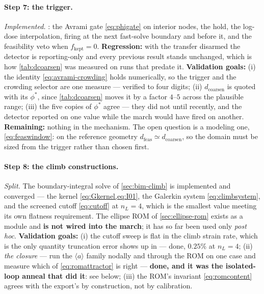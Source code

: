 \documentclass{article}
\newcommand{\aloop}{\ensuremath{\langle a\rangle}}
\begin{document}
\paragraph{Step 7: the trigger.} \emph{Implemented.} : the
Avrami gate \cref{eq:phigate} on interior nodes, the hold, the log-dose
interpolation, firing at the next fast-solve boundary and before it, and the
feasibility veto when $f_{\mathrm{kept}}=0$. \textbf{Regression:} with the
transfer disarmed the detector is reporting-only and every previous result stands
unchanged, which is how \cref{tab:dcoarsen} was measured on runs that predate it.
\textbf{Validation goals:} (i) the identity \cref{eq:avrami-crowding} holds
numerically, so the trigger and the crowding selector are one measure --- verified
to four digits; (ii) $d_{\mathrm{coarsen}}$ is quoted with its $\phi^\ast$, since
\cref{tab:dcoarsen} moves it by a factor $4$--$5$ across the plausible range;
(iii) the five copies of $\phi^\ast$ agree --- they did not until recently, and
the detector reported on one value while the march would have fired on another.
\textbf{Remaining:} nothing in the mechanism. The open question is a modeling
one, \cref{eq:feaswindow}: on the reference geometry $d_{\mathrm{feas}}\simeq
d_{\mathrm{coarsen}}$, so the domain must be sized from the trigger rather than
chosen first.

\paragraph{Step 8: the climb constructions.} \emph{Split.} The boundary-integral
solve of \cref{sec:bim-climb} is implemented and converged --- the kernel
\cref{eq:Gkernel,eq:I01}, the Galerkin system \cref{eq:climbsystem}, and the
screened cutoff \cref{eq:cutoff} at $n_L=4$, which is the smallest value meeting
its own flatness requirement. The ellipse ROM of \cref{sec:ellipse-rom} exists as
a module and \textbf{is not wired into the march}; it has so far been used only
\emph{post hoc}.
\textbf{Validation goals:} (i) the cutoff sweep is flat in the climb strain rate,
which is the only quantity truncation error shows up in --- done, $0.25\%$ at
$n_L=4$; (ii) \emph{the closure} --- run the \aloop{} family nodally and through
the ROM on one case and measure which of \cref{eq:romattractor} is right ---
\textbf{done, and it was the isolated-loop anneal that did it}: see below;
(iii) the ROM's invariant \cref{eq:romcontent} agrees with the export's
by construction, not by calibration.
\end{document}
